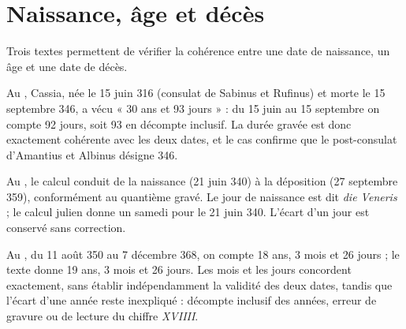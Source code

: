 \section{Naissance, âge et décès}

Trois textes permettent de vérifier la cohérence entre une date de naissance, un âge et une date de décès.

Au , Cassia, née le 15 juin 316 (consulat de Sabinus et Rufinus) et morte le 15 septembre 346, a vécu « 30 ans et 93 jours » : du 15 juin au 15 septembre on compte 92 jours, soit 93 en décompte inclusif. La durée gravée est donc exactement cohérente avec les deux dates, et le cas confirme que le post-consulat d’Amantius et Albinus désigne 346.

Au , le calcul conduit de la naissance (21 juin 340) à la déposition (27 septembre 359), conformément au quantième gravé. Le jour de naissance est dit \emph{die Veneris} ; le calcul julien donne un samedi pour le 21 juin 340. L’écart d’un jour est conservé sans correction.

Au , du 11 août 350 au 7 décembre 368, on compte 18 ans, 3 mois et 26 jours ; le texte donne 19 ans, 3 mois et 26 jours. Les mois et les jours concordent exactement, sans établir indépendamment la validité des deux dates, tandis que l’écart d’une année reste inexpliqué : décompte inclusif des années, erreur de gravure ou de lecture du chiffre \emph{XVIIII}.
